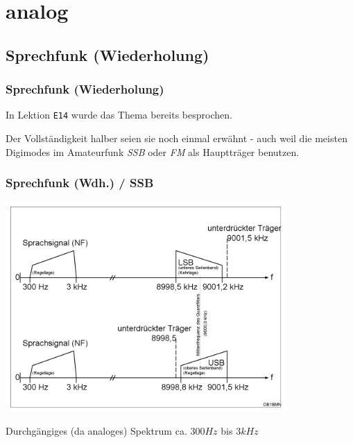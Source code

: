 \section{analog}

\subsection[Sprechfunk]{Sprechfunk (Wiederholung)}

\begin{frame}
    \frametitle{Sprechfunk (Wiederholung)}

    In Lektion \texttt{E14} wurde das Thema bereits besprochen.

    Der Vollständigkeit halber seien sie noch einmal erwähnt - auch weil die
    meisten Digimodes im Amateurfunk \emph{SSB} oder \emph{FM} als Hauptträger
    benutzen.

\end{frame}

\begin{frame}
    \frametitle{Sprechfunk (Wdh.) / SSB}

    \begin{center}
        \includegraphics[width=0.8\textwidth]{e16/Ssb-de.png}
        \tiny \hyperlink{refs}{\cite{wc}}
    \end{center}

    Durchgängiges (da analoges) Spektrum ca. $300 Hz$ bis $3 kHz$

\end{frame}

